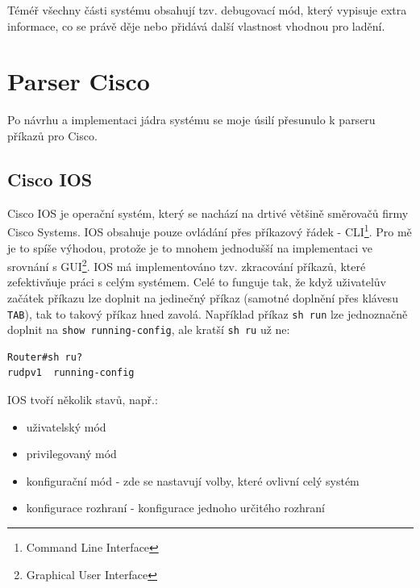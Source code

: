 Téméř všechny části systému obsahují tzv. debugovací mód, který vypisuje extra informace, co se právě děje nebo přidává další vlastnost vhodnou pro ladění.

\section{Parser Cisco}
Po návrhu a implementaci jádra systému se moje úsilí přesunulo k parseru příkazů pro Cisco. 

\subsection{Cisco IOS}
Cisco IOS je operační systém, který se nachází na drtivé většině směrovačů firmy Cisco Systems. IOS obsahuje pouze ovládání přes příkazový řádek - CLI\footnote{Command Line Interface}. Pro mě je to spíše výhodou, protože je to mnohem jednodušší na implementaci ve srovnání s  GUI\footnote{Graphical User Interface}. IOS má implementováno tzv. zkracování příkazů, které zefektivňuje práci s celým systémem. Celé to funguje tak, že když uživatelův začátek příkazu lze doplnit na jedinečný příkaz (samotné doplnění přes klávesu \verb|TAB|), tak to takový příkaz hned zavolá. Například příkaz \verb|sh run| lze jednoznačně doplnit na \verb|show running-config|, ale kratší \verb|sh ru| už ne:
\begin{verbatim}
Router#sh ru?
rudpv1  running-config
\end{verbatim} 

IOS tvoří několik stavů, např.:
\begin{itemize}
 \item uživatelský mód
 \item privilegovaný mód
 \item konfigurační mód - zde se nastavují volby, které ovlivní celý systém
 \item konfigurace rozhraní - konfigurace jednoho určitého rozhraní
\end{itemize}

